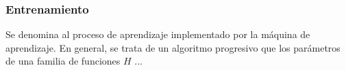 %
\subsubsection{Entrenamiento}
%
Se denomina  al proceso de aprendizaje implementado por
la máquina de aprendizaje. En general, se trata de un algoritmo progresivo
que  los parámetros de una familia de funciones $H$ ...